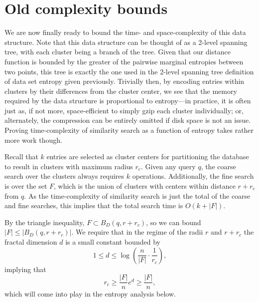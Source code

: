 \documentclass{amsbook}
\theoremstyle{definition}
\theoremstyle{remark}
\numberwithin{equation}{section}
\begin{document}
\section{Old complexity bounds}

We are now finally ready to bound the time- and space-complexity of this data structure.
Note that this data structure can be thought of as a 2-level spanning tree, with each cluster being a branch of the tree.
Given that our distance function is bounded by the greater of the pairwise marginal entropies between two points, this tree is exactly the one used in the 2-level spanning tree definition of data set entropy given previously.
Trivially then, by encoding entries within clusters by their differences from the cluster center, we see that the memory required by the data structure is proportional to entropy---in practice, it is often just as, if not more, space-efficient to simply gzip each cluster individually; or, alternately, the compression can be entirely omitted if disk space is not an issue.
Proving time-complexity of similarity search as a function of entropy takes rather more work though.

Recall that $k$ entries are selected as cluster centers for partitioning the database to result in clusters with maximum radius $r_c$.
Given any query $q$, the coarse search over the clusters always requires $k$ operations.
Additionally, the fine search is over the set $F$, which is the union of clusters with centers within distance $r+r_c$ from $q$.
As the time-complexity of similarity search is just the total of the coarse and fine searches, this implies that the total search time is $O(k + |F|)$.

By the triangle inequality, $F \subset B_D(q,r+r_c)$,
so we can bound $|F| \le |B_D(q,r+r_c)|$.
We require that in the regime of the radii $r$ and $r+r_c$ the fractal dimension $d$ is a small constant bounded by
\[
    1 \le d \le \log \left( \frac{n}{|F|} \cdot \frac{1}{r_c} \right), 
\]
implying that
\[
    r_c \ge \frac{|F|}{n} e^d \ge \frac{|F|}{n} ,
\]
which will come into play in the entropy analysis below.
\end{document}
